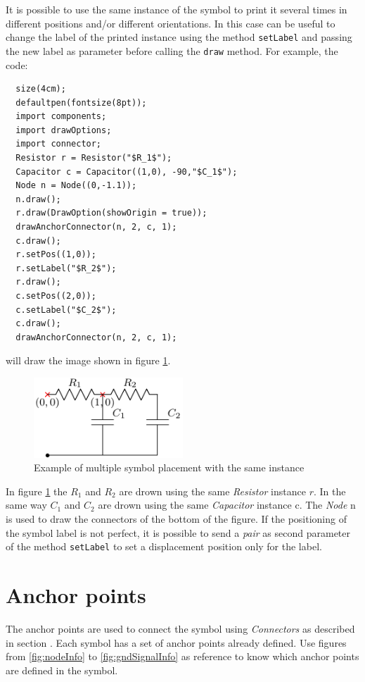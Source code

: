 \documentclass[a4paper,12pt]{report}
\begin{document}
It is possible to use the same instance of the symbol to print it several times in different positions and/or different orientations. In this case can be useful to change the label of the printed instance using the method \texttt{setLabel} and passing the new label as parameter before calling the \texttt{draw} method. For example, the code:
\begin{lstlisting}
  size(4cm);
  defaultpen(fontsize(8pt));
  import components;
  import drawOptions;
  import connector;
  Resistor r = Resistor("$R_1$");
  Capacitor c = Capacitor((1,0), -90,"$C_1$");
  Node n = Node((0,-1.1));
  n.draw();
  r.draw(DrawOption(showOrigin = true));
  drawAnchorConnector(n, 2, c, 1);
  c.draw();
  r.setPos((1,0));
  r.setLabel("$R_2$");
  r.draw();
  c.setPos((2,0));
  c.setLabel("$C_2$");
  c.draw();
  drawAnchorConnector(n, 2, c, 1);
\end{lstlisting}
will draw the image shown in figure \ref{fig:placingExample3}.
\begin{figure}[ht]
  \centering
  \includegraphics[width=0.5\textwidth]{placingExample3.pdf}
  \caption{Example of multiple symbol placement with the same instance}
  \label{fig:placingExample3}
\end{figure}

In figure \ref{fig:placingExample3} the $R_1$ and $R_2$ are drown using the same \emph{Resistor} instance $r$. In the same way $C_1$ and $C_2$ are drown using the same \emph{Capacitor} instance c. The \emph{Node} n is used to draw the connectors of the bottom of the figure. If the positioning of the symbol label is not perfect, it is possible to send a \emph{pair} as second parameter of the method \texttt{setLabel} to set a displacement position only for the label. 

\section*{Anchor points}
\label{sct:anchorPoints}

The anchor points are used to connect the symbol using \emph{Connectors} as described in section . Each symbol has a set of anchor points already defined. Use figures from \ref{fig:nodeInfo} to \ref{fig:gndSignalInfo} as reference to know which anchor points are defined in the symbol.
\end{document}
